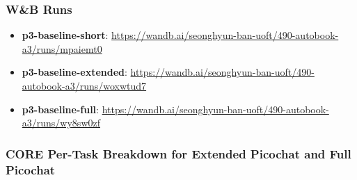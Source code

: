 \subsubsection*{W\&B Runs}

\begin{itemize}
  \item \textbf{p3-baseline-short}: \url{https://wandb.ai/seonghyun-ban-uoft/490-autobook-a3/runs/mpaiemt0}
  \item \textbf{p3-baseline-extended}: \url{https://wandb.ai/seonghyun-ban-uoft/490-autobook-a3/runs/woxwtud7}
  \item \textbf{p3-baseline-full}: \url{https://wandb.ai/seonghyun-ban-uoft/490-autobook-a3/runs/wy8sw0zf}
\end{itemize}

\subsubsection*{CORE Per-Task Breakdown for Extended Picochat and Full Picochat}

